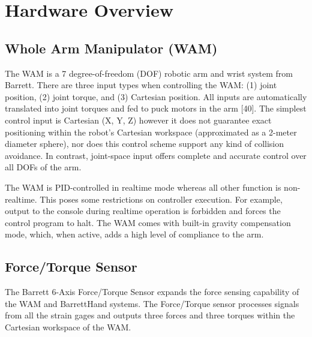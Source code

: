 \chapter{Hardware Overview}
\label{apx_B}



\section{Whole Arm Manipulator (WAM)} 

The WAM is a 7 degree-of-freedom (DOF) robotic arm and wrist system from Barrett.
There are three input types when controlling the WAM: (1) joint position, (2) joint torque, and (3) Cartesian position.
All inputs are automatically translated into joint torques and fed to puck motors in the arm [40].
The simplest control input is Cartesian (X, Y, Z) however it does not guarantee exact positioning within the robot’s Cartesian workspace (approximated as a 2-meter diameter sphere), nor does this control scheme support any kind of collision avoidance.
In contrast, joint-space input offers complete and accurate control over all DOFs of the arm.

The WAM is PID-controlled in realtime mode whereas all other function is non-realtime.
This poses some restrictions on controller execution.
For example, output to the console during realtime operation is forbidden and forces the control program to halt.
The WAM comes with built-in gravity compensation mode, which, when active, adds a high level of compliance to the arm.


\section{Force/Torque Sensor} 

The Barrett 6-Axis Force/Torque Sensor expands the force sensing capability of the WAM and BarrettHand systems.
The Force/Torque sensor processes signals from all the strain gages and outputs three forces and three torques within the Cartesian workspace of the WAM.

